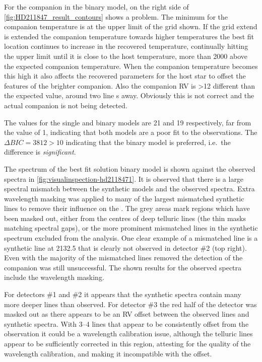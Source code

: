 For the companion in the binary model, on the right side of \cref{fig:HD211847_result_contours} shows a problem.
The minimum \textchisquared{} for the companion temperature is at the upper limit of the grid shown.
If the grid extend is extended the companion temperature towards higher temperatures the best fit location continues to increase in the recovered temperature, continually hitting the upper limit until it is close to the host temperature, more than 2000\K{} above the expected companion temperature.
When the companion temperature becomes this high it also affects the recovered parameters for the host star to offset the features of the brighter companion.
Also the companion {RV} is >12\kmps{} different than the expected value, around two line \fwhm{}s away.
Obviously this is not correct and the actual companion is not being detected.

The \textchisquaredreduced{} values for the single and binary models are 21 and 19 respectively, far from the value of 1, indicating that both models are a poor fit to the observations.
The \(\Delta {BIC} = 3812 >10\) indicating that the binary model is preferred, i.e.\ the difference is \textit{significant}.

The spectrum of the best fit solution binary model is shown against the observed spectra in \cref{fig:visualinspection-hd2118471}.
It is observed that there is a large spectral mismatch between the synthetic models and the observed spectra.
Extra wavelength masking was applied to many of the largest mismatched synthetic lines to remove their influence on the \textchisquared{}.
The grey areas mark regions which have been masked out, either from the centres of deep telluric lines (the thin masks matching spectral gaps), or the more prominent mismatched lines in the synthetic spectrum excluded from the \textchisquared{} analysis.
One clear example of a mismatched line is a synthetic line at 2132.5\nm{} that is clearly not observed in detector \#2 (top right).
Even with the majority of the mismatched lines removed the detection of the companion was still unsuccessful.
The shown results for the observed spectra include the wavelength masking.

For detectors \#1 and \#2 it appears that the synthetic spectra contain many more deeper lines than observed.
For detector \#3 the red half of the detector was masked out as there appears to be an {RV} offset between the observed lines and synthetic spectra.
With 3--4 lines that appear to be consistently offset from the observation it could be a wavelength calibration issue, although the telluric lines appear to be sufficiently corrected in this region, attesting for the quality of the wavelength calibration, and making it incompatible with the offset.


